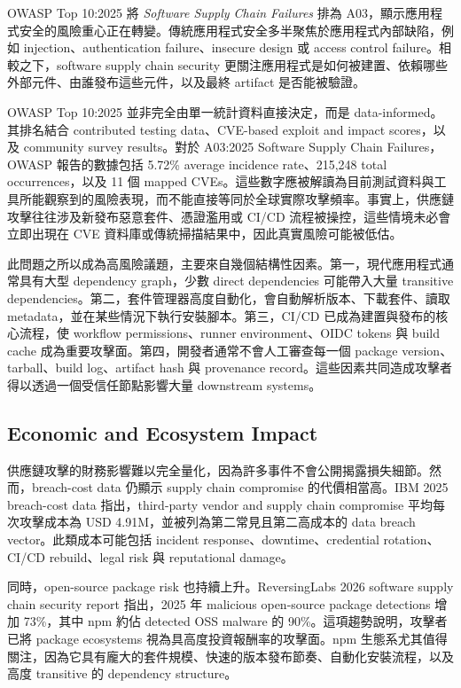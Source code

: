 \documentclass[12pt,a4paper]{article}
\begin{document}
OWASP Top 10:2025 將 \textit{Software Supply Chain Failures} 排為 A03，顯示應用程式安全的風險重心正在轉變。傳統應用程式安全多半聚焦於應用程式內部缺陷，例如 injection、authentication failure、insecure design 或 access control failure。相較之下，software supply chain security 更關注應用程式是如何被建置、依賴哪些外部元件、由誰發布這些元件，以及最終 artifact 是否能被驗證。

OWASP Top 10:2025 並非完全由單一統計資料直接決定，而是 data-informed。其排名結合 contributed testing data、CVE-based exploit and impact scores，以及 community survey results。對於 A03:2025 Software Supply Chain Failures，OWASP 報告的數據包括 5.72\% average incidence rate、215,248 total occurrences，以及 11 個 mapped CVEs。這些數字應被解讀為目前測試資料與工具所能觀察到的風險表現，而不能直接等同於全球實際攻擊頻率。事實上，供應鏈攻擊往往涉及新發布惡意套件、憑證濫用或 CI/CD 流程被操控，這些情境未必會立即出現在 CVE 資料庫或傳統掃描結果中，因此真實風險可能被低估。

此問題之所以成為高風險議題，主要來自幾個結構性因素。第一，現代應用程式通常具有大型 dependency graph，少數 direct dependencies 可能帶入大量 transitive dependencies。第二，套件管理器高度自動化，會自動解析版本、下載套件、讀取 metadata，並在某些情況下執行安裝腳本。第三，CI/CD 已成為建置與發布的核心流程，使 workflow permissions、runner environment、OIDC tokens 與 build cache 成為重要攻擊面。第四，開發者通常不會人工審查每一個 package version、tarball、build log、artifact hash 與 provenance record。這些因素共同造成攻擊者得以透過一個受信任節點影響大量 downstream systems。

\subsection{Economic and Ecosystem Impact}

供應鏈攻擊的財務影響難以完全量化，因為許多事件不會公開揭露損失細節。然而，breach-cost data 仍顯示 supply chain compromise 的代價相當高。IBM 2025 breach-cost data 指出，third-party vendor and supply chain compromise 平均每次攻擊成本為 USD 4.91M，並被列為第二常見且第二高成本的 data breach vector。此類成本可能包括 incident response、downtime、credential rotation、CI/CD rebuild、legal risk 與 reputational damage。

同時，open-source package risk 也持續上升。ReversingLabs 2026 software supply chain security report 指出，2025 年 malicious open-source package detections 增加 73\%，其中 npm 約佔 detected OSS malware 的 90\%。這項趨勢說明，攻擊者已將 package ecosystems 視為具高度投資報酬率的攻擊面。npm 生態系尤其值得關注，因為它具有龐大的套件規模、快速的版本發布節奏、自動化安裝流程，以及高度 transitive 的 dependency structure。
\end{document}
